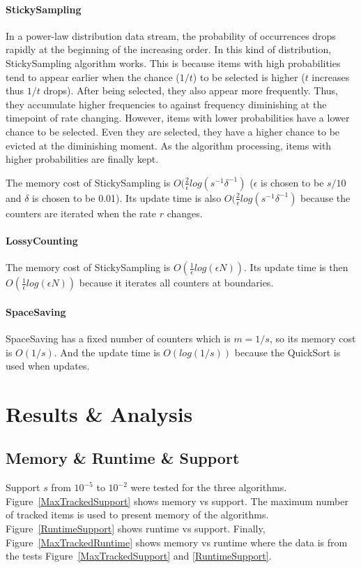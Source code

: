 \documentclass[10pt]{article}
\begin{document}
\paragraph{StickySampling}
In a power-law distribution data stream, the probability of occurrences drops rapidly at the beginning of the increasing order. In this kind of distribution, StickySampling algorithm works. 
This is because items with high probabilities tend to appear earlier when the chance ($1/t$) to be selected is higher ($t$ increases thus $1/t$ drops).
After being selected, they also appear more frequently. Thus, they accumulate higher frequencies to against frequency diminishing at the timepoint of rate changing.
However, items with lower probabilities have a lower chance to be selected. 
Even they are selected, they have a higher chance to be evicted at the diminishing moment.
As the algorithm processing, items with higher probabilities are finally kept.

The memory cost of StickySampling is $O(\frac{2}{\epsilon}log(s^{-1}\delta^{-1})$ \cite{stickylossy}
($\epsilon{}$ is chosen to be $s/10$ and $\delta{}$ is chosen to be 0.01).
Its update time is also $O(\frac{2}{\epsilon}log(s^{-1}\delta^{-1})$ because the counters are iterated when the rate $r$ changes.
\paragraph{LossyCounting}
The memory cost of StickySampling is $O(\frac{1}{\epsilon}log(\epsilon{}N))$. 
Its update time is then $O(\frac{1}{\epsilon}log(\epsilon{}N))$ because it iterates all counters at boundaries.
\paragraph{SpaceSaving}
SpaceSaving has a fixed number of counters which is $m = 1/s$, so its memory cost is $O(1/s)$. 
And the update time is $O(log(1/s))$ because the QuickSort is used when updates.

\section{Results \& Analysis} \label{resultsanalysis}

\subsection{Memory \& Runtime \& Support}
Support $s$ from $10^{-5}$ to $10^{-2}$ were tested for the three algorithms.
Figure~\ref{MaxTrackedSupport} shows memory vs support. 
The maximum number of tracked items is used to present memory of the algorithms.
Figure~\ref{RuntimeSupport} shows runtime vs support.
Finally, Figure~\ref{MaxTrackedRuntime} shows memory vs runtime 
where the data is from the tests Figure~\ref{MaxTrackedSupport} and \ref{RuntimeSupport}.
\end{document}
